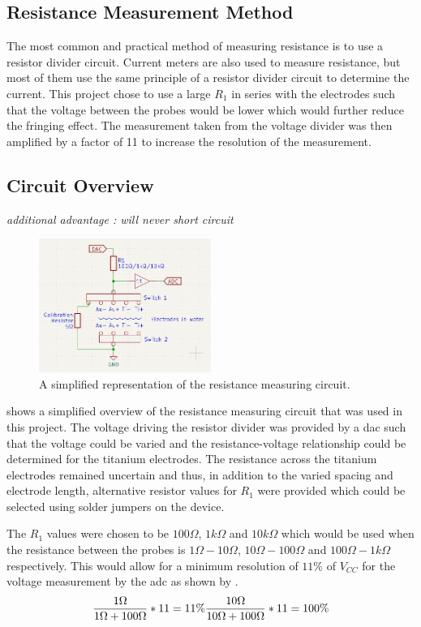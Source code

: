 \subsection{Resistance Measurement Method}

The most common and practical method of measuring resistance is to use a resistor divider circuit.
Current meters are also used to measure resistance, but most of them use the same principle of a resistor divider circuit to determine the current.
This project chose to use a large $R_1$ in series with the electrodes such that the voltage between the probes would be lower which would further reduce the fringing effect.
The measurement taken from the voltage divider was then amplified by a factor of 11 to increase the resolution of the measurement.

\subsection{Circuit Overview}
\textit{additional advantage : will never short circuit}
\begin{figure}
    \centering
    \includegraphics[width=0.5\textwidth]{Figures/CircuitOverview}
    \caption{A simplified representation of the resistance measuring circuit.}
    \label{fig:circuit-overview} %
\end{figure}

 shows a simplified overview of the resistance measuring circuit that was used in this project.
The voltage driving the resistor divider was provided by a \gls{dac} such that the voltage could be varied and the resistance-voltage relationship could be determined for the titanium electrodes.
The resistance across the titanium electrodes remained uncertain and thus, in addition to the varied spacing and electrode length, alternative resistor values for $R_1$ were provided which could be selected using solder jumpers on the device.

The $R_1$ values were chosen to be $100\Omega$, $1k\Omega$ and $10k\Omega$ which would be used when the resistance between the probes is $1\Omega - 10\Omega$, $10\Omega - 100\Omega$ and $100\Omega - 1k\Omega$ respectively.
This would allow for a minimum resolution of $11\%$ of $V_{CC}$ for the voltage measurement by the \gls{adc} as shown by .
\begin{equation}\label{eqn:adc-resolution}
    \frac{\displaystyle 1\Omega}{\displaystyle 1\Omega + 100\Omega} * 11 = 11\%
    \frac{\displaystyle 10\Omega}{\displaystyle 10\Omega + 100\Omega} * 11 = 100\%
\end{equation} 

